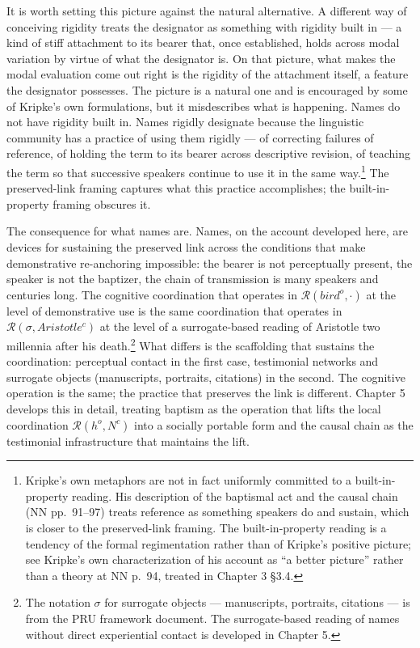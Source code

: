 \documentclass[10pt]{article}
\begin{document}
It is worth setting this picture against the natural alternative. A different way of conceiving rigidity treats the designator as something with rigidity built in --- a kind of stiff attachment to its bearer that, once established, holds across modal variation by virtue of what the designator is. On that picture, what makes the modal evaluation come out right is the rigidity of the attachment itself, a feature the designator possesses. The picture is a natural one and is encouraged by some of Kripke's own formulations, but it misdescribes what is happening. Names do not have rigidity built in. Names rigidly designate because the linguistic community has a practice of using them rigidly --- of correcting failures of reference, of holding the term to its bearer across descriptive revision, of teaching the term so that successive speakers continue to use it in the same way.\footnote{Kripke's own metaphors are not in fact uniformly committed to a built-in-property reading. His description of the baptismal act and the causal chain (NN pp.~91--97) treats reference as something speakers do and sustain, which is closer to the preserved-link framing. The built-in-property reading is a tendency of the formal regimentation rather than of Kripke's positive picture; see Kripke's own characterization of his account as ``a better picture'' rather than a theory at NN p.~94, treated in Chapter 3 §3.4.} The preserved-link framing captures what this practice accomplishes; the built-in-property framing obscures it.

The consequence for what names are. Names, on the account developed here, are devices for sustaining the preserved link across the conditions that make demonstrative re-anchoring impossible: the bearer is not perceptually present, the speaker is not the baptizer, the chain of transmission is many speakers and centuries long. The cognitive coordination that operates in \(\mathcal{R}(bird^o, \cdot)\) at the level of demonstrative use is the same coordination that operates in \(\mathcal{R}(\sigma, Aristotle^c)\) at the level of a surrogate-based reading of Aristotle two millennia after his death.\footnote{The notation \(\sigma\) for surrogate objects --- manuscripts, portraits, citations --- is from the PRU framework document. The surrogate-based reading of names without direct experiential contact is developed in Chapter 5.} What differs is the scaffolding that sustains the coordination: perceptual contact in the first case, testimonial networks and surrogate objects (manuscripts, portraits, citations) in the second. The cognitive operation is the same; the practice that preserves the link is different. Chapter 5 develops this in detail, treating baptism as the operation that lifts the local coordination \(\mathcal{R}(h^o, N^c)\) into a socially portable form and the causal chain as the testimonial infrastructure that maintains the lift.
\end{document}
